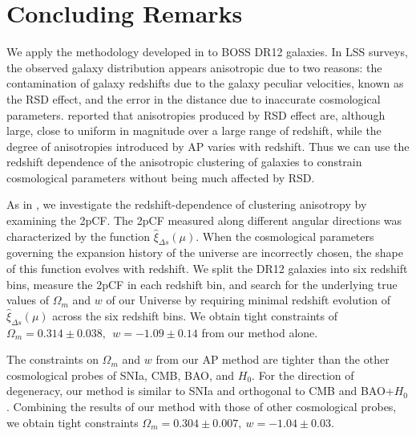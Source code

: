 \documentclass[iop]{emulateapj}
\begin{document}





\section{Concluding Remarks}

We apply the methodology developed in \cite{Li2014,Li2015} to BOSS DR12 galaxies.
In LSS surveys, the observed galaxy distribution appears anisotropic due to two reasons:
the contamination of galaxy redshifts due to the galaxy peculiar velocities, known as the RSD effect, 
and the error in the distance due to inaccurate cosmological parameters. %
\cite{Li2014} reported that anisotropies produced by RSD effect are, although large,
close to uniform in magnitude over a large range of redshift,
while the degree of anisotropies introduced by AP varies with redshift. 
Thus we can use the redshift dependence of the anisotropic clustering of galaxies to constrain cosmological parameters without 
being much affected by RSD.

As in \cite{Li2015}, we investigate the redshift-dependence of clustering anisotropy by examining the 2pCF.
The 2pCF measured along different angular directions was characterized by the function $\hat \xi_{\Delta s}(\mu)$.
When the cosmological parameters governing the expansion history of the universe are incorrectly chosen,
the shape of this function evolves with redshift.
We split the DR12 galaxies into six redshift bins, measure the 2pCF in each redshift bin,
and search for the underlying true values of $\Omega_m$ and $w$ of our Universe %
by requiring minimal redshift evolution of $\hat \xi_{\Delta s}(\mu)$ across the six redshift bins.
We obtain tight constraints of $\Omega_m=0.314 \pm 0.038,\ \ w = -1.09 \pm 0.14$ from our method alone.

The constraints on $\Omega_m$ and $w$ from our AP method are tighter %
than the other cosmological probes of SNIa, CMB, BAO, and $H_0$.
For the direction of degeneracy, %
our method is similar to SNIa and orthogonal to CMB and BAO+$H_0$.
Combining the results of our method with those of other cosmological probes, 
we obtain tight constraints $ \Omega_m = 0.304 \pm 0.007,\ w=-1.04 \pm 0.03$.
\end{document}
